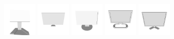 \begin{figure}[!t]
	\includegraphics[width=0.15\textwidth]{Figures/ObjRecog/monitor_0}\hfill
	\includegraphics[width=0.15\textwidth]{Figures/ObjRecog/monitor_1}\hfill
	\includegraphics[width=0.15\textwidth]{Figures/ObjRecog/monitor_2}\hfill
	\includegraphics[width=0.15\textwidth]{Figures/ObjRecog/monitor_3}\hfill
	\includegraphics[width=0.15\textwidth]{Figures/ObjRecog/monitor_4}\hfill


\end{figure}
